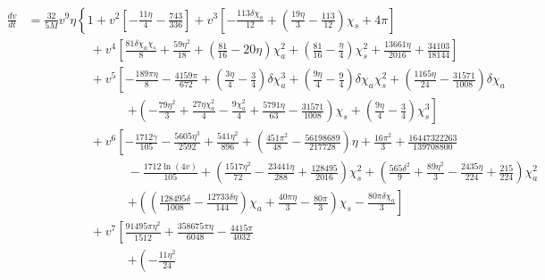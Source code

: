 {\footnotesize
\begin{equation}\label{eq:dvByDt}
  \begin{split}
    \frac{dv}{dt} & = \frac{32}{5M} v^9 \eta \left\{1 + v^2
      \left[-\frac{11 \eta }{4}-\frac{743}{336} \right] + v^3
      \left[-\frac{113 \delta \chi_a}{12}+\left(\frac{19 \eta }{3}
          -\frac{113}{12}\right) \chi_s+4 \pi \right] \right. \\
    & \qquad\qquad\quad + v^4 \left[\frac{81 \delta \chi_a
        \chi_s}{8}+\frac{59 \eta ^2}{18} +\left(\frac{81}{16}-20 \eta
      \right) \chi_a^2+\left(\frac{81}{16}-\frac{\eta }{4}\right)
      \chi_s^2+\frac{13661 \eta
      }{2016}+\frac{34103}{18144} \right] \\
    & \qquad\qquad\quad + v^5 \left[-\frac{189 \pi \eta
      }{8}-\frac{4159 \pi }{672} + \left(\frac{3 \eta
        }{4}-\frac{3}{4}\right) \delta \chi_a^3 + \left(\frac{9 \eta
        }{4}-\frac{9}{4}\right) \delta \chi_a \chi_s^2
      + \left(\frac{1165 \eta }{24}-\frac{31571}{1008}\right) \delta \chi_a \right. \\
    & \qquad\qquad\qquad \qquad \left. + \left(-\frac{79 \eta ^2}{3}+
        \frac{27 \eta \chi_a^2}{4} -\frac{9 \chi_a^2}{4}+\frac{5791
          \eta }{63}-\frac{31571}{1008}\right) \chi_s
      +\left(\frac{9 \eta }{4}-\frac{3}{4}\right) \chi_s^3 \right] \\
    & \qquad\qquad\quad + v^6 \left[-\frac{1712 \gamma }{105}
      -\frac{5605 \eta ^3}{2592}+\frac{541 \eta
        ^2}{896}+\left(\frac{451 \pi ^2}{48}
        -\frac{56198689}{217728}\right) \eta +\frac{16 \pi ^2}{3}
      +\frac{16447322263}{139708800} \right. \\
    & \qquad\qquad\qquad \qquad -\frac{1712 \ln (4v)}{105} +
    \left(\frac{1517 \eta ^2}{72}-\frac{23441 \eta }{288}
      +\frac{128495}{2016} \right) \chi_s^2 + \left(\frac{565 \delta
        ^2}{9}+\frac{89 \eta ^2}{3}-\frac{2435 \eta }{224}
      +\frac{215}{224} \right) \chi_a^2 \\
    & \qquad\qquad\qquad \qquad \left. + \left(\left(\frac{128495
            \delta }{1008} -\frac{12733 \delta \eta }{144}\right)
        \chi_a +\frac{40 \pi \eta }{3}
        -\frac{80 \pi }{3}\right) \chi_s -\frac{80 \pi  \delta \chi_a}{3} \right] \\
    & \qquad\qquad\quad + v^7 \left[\frac{91495 \pi \eta ^2}{1512}
      +\frac{358675 \pi  \eta }{6048}-\frac{4415 \pi }{4032} \right. \\
    & \qquad\qquad\qquad \qquad \left.  + \left(-\frac{11 \eta ^2}{24}

\end{split}
\end{equation}}
